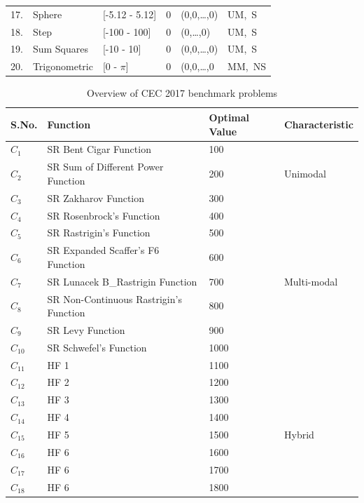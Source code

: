 \begin{table}[t]
\begin{tabular}{p{0.3in} p{1.2in}  p{0.9in} p{0.8in} p{1.5in} p{0.6in}}
17.    &    Sphere    &        [-5.12 - 5.12]    &    0    &(0,0,\dots,0)    & UM,\ S\\
18. &    Step    &        [-100 - 100]    &     0    &     (0,\dots,0)& UM,\ S\\
19.    &    Sum Squares    &        [-10 - 10]     &    0 &    (0,0,\dots,0)    & UM,\ S\\
20.    &    Trigonometric    &        [0 - $\pi$]    &     0    &     (0,0,\dots,0& MM,\ NS \\
\hline
\end{tabular}
\label{tab:BenchmarkFunctions}
\end{table}


\begin{table}[t]
\scriptsize
\caption[Overview of CEC 2017 benchmark problems]{\fontsize{10}{12} \selectfont Overview of CEC 2017 benchmark problems}
\centering
\renewcommand{\arraystretch}{1.2}
\begin{tabular}{p{1in}   p{2in}   p{0.8in} p{0.9in}}
    \hline
\textbf{S.No.}& \textbf{Function}  &  \textbf{Optimal Value } &\textbf{Characteristic}\\
\hline
$C_1$ & SR Bent Cigar Function & 100 &   \\
$C_2$ & SR Sum of Different Power Function & 200 &Unimodal \\
$C_3$ & SR Zakharov Function & 300 &  \\ 
\hline
 $C_4$& SR Rosenbrock’s Function & 400 &\\ 
 $C_5$& SR Rastrigin’s Function & 500 & \\ 
 $C_6$& SR Expanded Scaffer’s F6 Function & 600 & \\ 
 $C_7$& SR Lunacek B\_Rastrigin Function & 700 &  Multi-modal \\ 
$C_8$& SR Non-Continuous Rastrigin’s Function & 800 & \\  
$C_9$& SR Levy Function & 900 & \\
$C_{10}$ & SR Schwefel’s Function & 1000 &   \\
\hline
$C_{11}$ & HF 1  & 1100 &  \\
 $C_{12}$& HF  2  & 1200 & \\
 $C_{13}$& HF  3  & 1300 &  \\
 $C_{14}$& HF  4  & 1400 & \\
 $C_{15}$& HF  5 & 1500 &  Hybrid\\
 $C_{16}$& HF  6 & 1600 & \\
 $C_{17}$& HF  6 & 1700 & \\
 $C_{18}$& HF  6  & 1800 & \\

\end{tabular}
\end{table}
